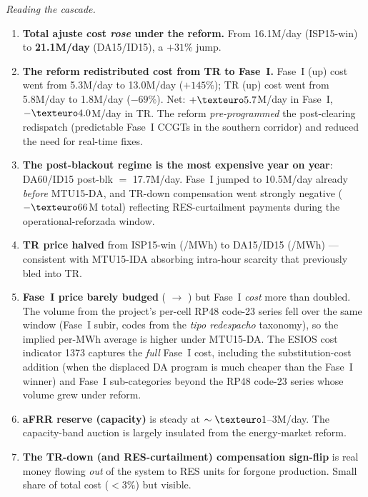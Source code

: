 \documentclass[11pt,a4paper]{article}
\begin{document}
\textit{Reading the cascade.}
\begin{enumerate}\setlength{\itemsep}{1pt}
\item \textbf{Total ajuste cost \emph{rose} under the reform.} From \texteuro 16.1M/day (ISP15-win) to \textbf{\texteuro 21.1M/day} (DA15/ID15), a $+31\%$ jump.
\item \textbf{The reform redistributed cost from TR to Fase~I.} Fase~I (up) cost went from \texteuro 5.3M/day to \texteuro 13.0M/day ($+145\%$); TR (up) cost went from \texteuro 5.8M/day to \texteuro 1.8M/day ($-69\%$). Net: $+\texteuro 5.7$M/day in Fase~I, $-\texteuro 4.0$M/day in TR. The reform \emph{pre-programmed} the post-clearing redispatch (predictable Fase~I CCGTs in the southern corridor) and reduced the need for real-time fixes.
\item \textbf{The post-blackout regime is the most expensive year on year}: DA60/ID15 post-blk $=$ \texteuro 17.7M/day. Fase~I jumped to \texteuro 10.5M/day already \emph{before} MTU15-DA, and TR-down compensation went strongly negative ($-\texteuro 66$M total) reflecting RES-curtailment payments during the operational-reforzada window.
\item \textbf{TR price halved} from ISP15-win (/MWh) to DA15/ID15 (/MWh) --- consistent with MTU15-IDA absorbing intra-hour scarcity that previously bled into TR.
\item \textbf{Fase~I price barely budged} ( $\to$ ) but Fase~I \emph{cost} more than doubled. The volume from the project's per-cell RP48 code-23 series fell over the same window (Fase~I subir, codes from the \emph{tipo redespacho} taxonomy), so the implied per-MWh average is higher under MTU15-DA. The ESIOS cost indicator 1373 captures the \emph{full} Fase~I cost, including the substitution-cost addition (when the displaced DA program is much cheaper than the Fase~I winner) and Fase~I sub-categories beyond the RP48 code-23 series whose volume grew under reform.
\item \textbf{aFRR reserve (capacity)} is steady at $\sim \texteuro 1$--$3$M/day. The capacity-band auction is largely insulated from the energy-market reform.
\item \textbf{The TR-down (and RES-curtailment) compensation sign-flip} is real money flowing \emph{out} of the system to RES units for forgone production. Small share of total cost ($<3\%$) but visible.
\end{enumerate}
\end{document}
